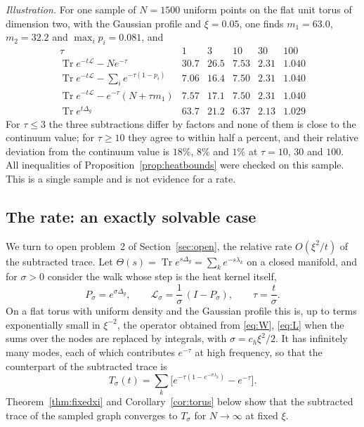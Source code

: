 \documentclass[11pt,a4paper]{article}
\theoremstyle{stmt}
\theoremstyle{defn}
\theoremstyle{rmk}
\numberwithin{equation}{section}
\DeclareMathOperator{\Tr}{Tr}
\newcommand{\Lc}{\mathcal{L}}
\begin{document}
{\emph{Illustration.} For one sample of $N=1500$ uniform points on the flat unit torus of dimension two, with the Gaussian profile and $\xi=0.05$, one finds $m_1=63.0$, $m_2=32.2$ and $\max_ip_i=0.081$, and
\[
\begin{array}{rccccc}
\tau & 1 & 3 & 10 & 30 & 100\\\hline
\Tr e^{-t\Lc}-Ne^{-\tau} & 30.7 & 26.5 & 7.53 & 2.31 & 1.040\\
\Tr e^{-t\Lc}-\sum_ie^{-\tau(1-p_i)} & 7.06 & 16.4 & 7.50 & 2.31 & 1.040\\
\Tr e^{-t\Lc}-e^{-\tau}(N+\tau m_1) & 7.57 & 17.1 & 7.50 & 2.31 & 1.040\\
\Tr e^{t\Delta_g} & 63.7 & 21.2 & 6.37 & 2.13 & 1.029
\end{array}
\]
For $\tau\le3$ the three subtractions differ by factors and none of them is close to the continuum value; for $\tau\ge10$ they agree to within half a percent, and their relative deviation from the continuum value is $18\%$, $8\%$ and $1\%$ at $\tau=10$, $30$ and $100$. All inequalities of Proposition~\ref{prop:heatbounds} were checked on this sample. This is a single sample and is not evidence for a rate.

\subsection{The rate: an exactly solvable case}\label{app:rate}

We turn to open problem~2 of Section~\ref{sec:open}, the relative rate $O(\xi^2/t)$ of the subtracted trace. Let $\Theta(s)=\Tr e^{s\Delta_g}=\sum_ke^{-s\lambda_k}$ on a closed manifold, and for $\sigma>0$ consider the walk whose step is the heat kernel itself,
\[
P_\sigma=e^{\sigma\Delta_g},\qquad\Lc_\sigma=\frac{1}{\sigma}\,(I-P_\sigma),\qquad\tau=\frac t\sigma .
\]
On a flat torus with uniform density and the Gaussian profile this is, up to terms exponentially small in $\xi^{-2}$, the operator obtained from \eqref{eq:W}, \eqref{eq:L} when the sums over the nodes are replaced by integrals, with $\sigma=c_h\xi^2/2$. It has infinitely many modes, each of which contributes $e^{-\tau}$ at high frequency, so that the counterpart of the subtracted trace is
\begin{equation}\label{eq:Tsigma}
T_\sigma(t)=\sum_k\Big[e^{-\tau(1-e^{-\sigma\lambda_k})}-e^{-\tau}\Big].
\end{equation}
Theorem~\ref{thm:fixedxi} and Corollary~\ref{cor:torus} below show that the subtracted trace of the sampled graph converges to $T_\sigma$ for $N\to\infty$ at fixed $\xi$.

}
\end{document}

